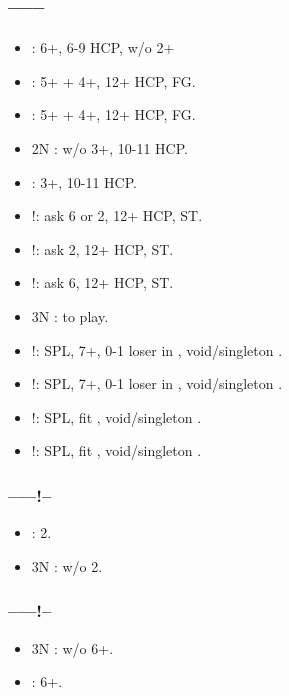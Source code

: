 \documentclass[12pt,twoside,a5paper]{report}%
\begin{document}
		\subsection*{------}
		\begin{itemize}
		\renewcommand{\labelitemi}{}
		\item {} : 6+\di{}, 6-9 HCP, w/o 2+\cl{}
		\item {} : 5+\di{} + 4+\he{}, 12+ HCP, FG.
		\item {} : 5+\di{} + 4+\sp{}, 12+ HCP, FG.
		\item 2N : w/o 3+\cl{}, 10-11 HCP.
		\item {} : 3+\cl{}, 10-11 HCP.
		\item {}!: ask 6\cl{} or 2\di{}, 12+ HCP, ST.
		\item {}!: ask 2\di{}, 12+ HCP, ST.
		\item {}!: ask 6\cl{}, 12+ HCP, ST.
		\item 3N : to play.
		\item {}!: SPL, 7+\di{}, 0-1 loser in \di{}, void/singleton \he{}.
		\item {}!: SPL, 7+\di{}, 0-1 loser in \di{}, void/singleton \sp{}.
		\item {}!: SPL, fit \cl{}, void/singleton \he{}.
		\item {}!: SPL, fit \cl{}, void/singleton \sp{}.	
		\end{itemize}

			\subsubsection*{------!--}
			\begin{itemize}
			\renewcommand{\labelitemi}{}
			\item {} : 2\di{}.
			\item 3N : w/o 2\di{}.
			\end{itemize}

			\subsubsection*{------!--}
			\begin{itemize}
			\renewcommand{\labelitemi}{}
			\item 3N : w/o  6+\cl{}.
			\item {} : 6+\cl{}.
			\end{itemize}
\end{document}
